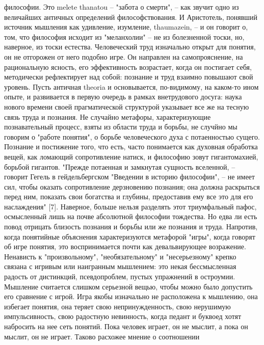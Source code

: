 \documentclass[12pt]{article}
\begin{document}
философии. Это melete thanatou -- "забота о смерти", -- как звучит одно из величайших античных определений
философствования. И Аристотель, понявший источник мышления как удивление, изумление, thaumazein, -- и он
говорит о, том, что философия исходит из "меланхолии" -- не из болезненной тоски, но, наверное, из тоски
естества.  Человеческий  труд  изначально  открыт  для  понятия,  он  не  отгорожен  от  него  подобно  игре.  Он
направлен на самопрояснение, на рациональную ясность, его эффективность возрастает, когда он постигает
себя, методически рефлектирует над собой: познание и труд взаимно повышают свой уровень. Пусть античная
theoria  и  основывается,  по-видимому,  на  каком-то  ином  опыте,  и  развивается  в  первую  очередь  в  рамках
внетрудового досуга: наука нового времени своей прагматической структурой указывает все же на тесную связь
труда и познания. Не случайно метафоры, характеризующие познавательный процесс, взяты из области труда и
борьбы, не случйно мы говорим о "работе понятия", о борьбе человеческого духа с потаенностью сущего.
Познание  и  постижение  того,  что  есть,  часто  понимается  как  духовная  обработка  вещей,  как  ломающий
сопротивление натиск, и философию зовут гигантомахией, борьбой гигантов. "Прежде потаенная и замкнутая
сущность вселенной, -- говорит Гегель в гейдельбергском "Введении в историю философии", -- не имеет сил,
чтобы  оказать  сопротивление  дерзновению  познания;  она  должна  раскрыться  перед  ним,  показать  свои
богатства и глубины, предоставив ему все это для его наслаждения" [7]. Наверное, больше нельзя разделять этот
триумфальный пафос, осмысленный лишь на почве абсолютной философии тождества. Но едва ли есть повод
отрицать  близость  познания  и борьбы  или  же  познания  и труда.  Напротив,  когда  понятийные объяснения
характеризуются  метафорой  "игры",  когда  говорят  об  игре  понятия,  это  воспринимается  почти  как 
девальвирующее  возражение.  Ненависть  к  "произвольному",  "необязательному"  и  "несерьезному"  крепко
связана  с  игривым  или  наигранным  мышлением:  это  некая  бессмысленная  радость  от  дистинкций,
псевдопроблем,  пустых  упражнений  в  остроумии.  Мышление  считается  слишком  серьезной  вещью,  чтобы
можно было  допустить его  сравнение  с  игрой. Игра якобы изначально не  расположена  к  мышлению,  она
избегает понятия, она теряет свою непринужденность, свою нерушимую импульсивность, свою радостную
невинность, когда педант и буквоед хотят набросить на нее сеть понятий.
Пока человек играет, он не мыслит, а пока он мыслит, он не играет. Таково расхожее мнение о соотношении
\end{document}
